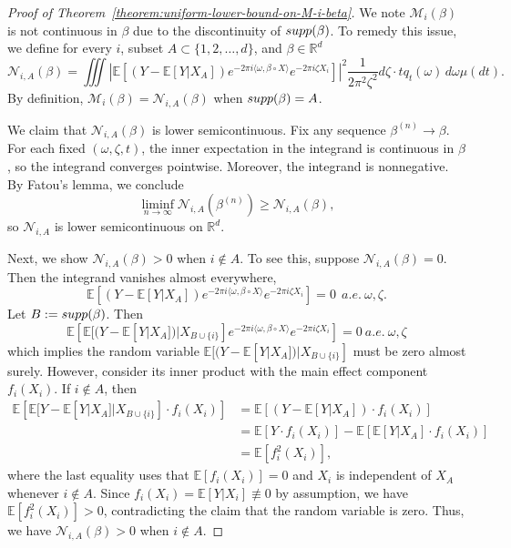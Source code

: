 \documentclass[10pt,a4paper]{amsart}
\newcommand{\E}{\mathbb{E}}
\newcommand{\R}{\mathbb{R}}
\newcommand{\supp}{\mathop{\rm supp}}
\begin{document}
\begin{proof}[Proof of Theorem~\ref{theorem:uniform-lower-bound-on-M-i-beta}]
We note $\mathcal{M}_i(\beta)$ is not continuous in $\beta$ due to the discontinuity of $\supp(\beta)$. 
To remedy this issue, we define for every $i$, subset $A \subset \{1, 2, \ldots, d\}$, and $\beta \in \R^d$
\begin{equation*}
	 \mathcal{N}_{i, A}(\beta) = \iiint \left|\E[(Y-\E[Y|X_A]) e^{-2\pi i \langle \omega, \beta\circ X \rangle} e^{-2\pi i \zeta X_i}] \right|^2 \frac{1}{2\pi^2 \zeta^2} d\zeta \cdot t q_t(\omega) \, d\omega  \mu(dt).
\end{equation*} 
By definition, $\mathcal{M}_i(\beta)  = \mathcal{N}_{i, A}(\beta)$ when $\supp(\beta) = A$. 

We claim that $\mathcal{N}_{i, A}(\beta)$ is lower semicontinuous. Fix any sequence $\beta^{(n)} \to \beta$. For each fixed $(\omega, \zeta, t)$, the inner expectation in the integrand is continuous in $\beta$, so the integrand converges pointwise. Moreover, the integrand is nonnegative. By Fatou’s lemma, we conclude
\[
\liminf_{n \to \infty} \mathcal{N}_{i, A}(\beta^{(n)}) \ge \mathcal{N}_{i, A}(\beta),
\]
so $\mathcal{N}_{i, A}$ is lower semicontinuous on $\R^d$. 

Next, we show $\mathcal{N}_{i, A}(\beta)  > 0$ when $i \not \in A$. To see this, 
suppose $ \mathcal{N}_{i, A}(\beta) = 0$. Then the integrand vanishes almost everywhere, 
\begin{equation*}
	\mathbb{E}[(Y-\E[Y|X_A]) e^{-2\pi i \langle \omega, \beta \circ X \rangle}  e^{-2\pi i \zeta X_i}] = 0~~a.e.~\omega, \zeta.
\end{equation*}
Let $B:=\supp(\beta)$. Then
\begin{equation*}
	\E\left[\E[(Y-\E[Y|X_A])|X_{B \cup \{i\}}]e^{-2\pi i \langle \omega, \beta \circ X \rangle}  e^{-2\pi i \zeta X_i}\right] = 0~a.e.~\omega, \zeta
\end{equation*} 
which implies the random variable $\E[(Y-\E[Y|X_A])|X_{B \cup \{i\}}]$
must be zero almost surely. However, consider its
inner product with the main effect component $f_{{i}}(X_i)$. If $i \not\in A$, then 
\begin{equation*}
\begin{split}
\mathbb{E}\left[\mathbb{E}[Y - \mathbb{E}[Y | X_A] | X_{B \cup \{i\}}] \cdot f_{{i}}(X_i)\right]
&= \mathbb{E}[(Y - \mathbb{E}[Y | X_A]) \cdot f_{{i}}(X_i)] \\
&= \mathbb{E}[Y \cdot f_{{i}}(X_i)] - \mathbb{E}[\mathbb{E}[Y| X_A] \cdot f_{{i}}(X_i)] \\
&= \mathbb{E}[f_{{i}}^2(X_i)],
\end{split}
\end{equation*}
where the last equality uses that $\E[f_i(X_i)] = 0$ and $X_i$ is independent of $X_A$ whenever $i \notin A$. Since $f_i(X_i) = \E[Y | X_i] \not\equiv 0$ by assumption, we have $\E[f_i^2(X_i)] > 0$, contradicting the claim that the random variable is zero. Thus, 
we have $\mathcal{N}_{i, A}(\beta)  > 0$ when $i \not \in A$.



\end{proof}
\end{document}
